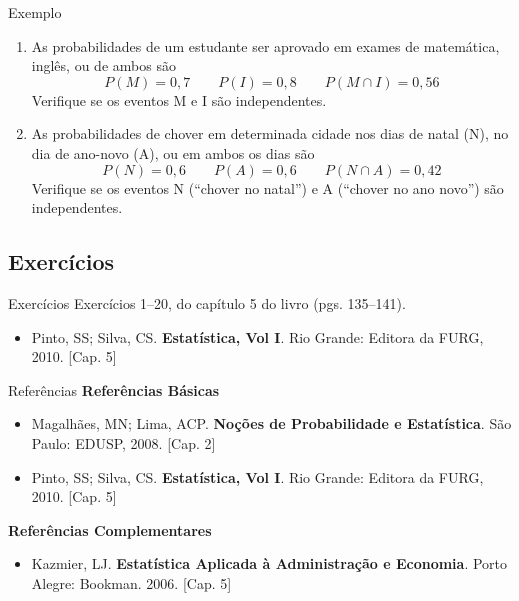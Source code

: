 \documentclass[10pt]{beamer}\usepackage[]{graphicx}\usepackage[]{color}
\theoremstyle{definition}
\begin{document}
\begin{frame}{Exemplo}
  \begin{enumerate}
  \item As probabilidades de um estudante ser aprovado em exames de
    matemática, inglês, ou de ambos são
    \begin{equation*}
      P(M) = 0,7 \qquad P(I) = 0,8 \qquad P(M \cap I) = 0,56
    \end{equation*}
    Verifique se os eventos M e I são independentes.
  \item As probabilidades de chover em determinada cidade nos
    dias de natal (N), no dia de ano-novo (A), ou em ambos os dias são
    \begin{equation*}
      P(N) = 0,6 \qquad P(A) = 0,6 \qquad P(N \cap A) = 0,42
    \end{equation*}
    Verifique se os eventos N (``chover no natal'') e A (``chover no ano
    novo'') são independentes.
  \end{enumerate}
\end{frame}

\subsection{Exercícios}

\begin{frame}[fragile]{Exercícios}
  Exercícios 1--20, do capítulo 5 do livro (pgs. 135--141).
  \vspace{1em}
  \begin{itemize}
  \item[] Pinto, SS; Silva, CS. \textbf{Estatística, Vol I}. Rio Grande:
    Editora da FURG, 2010. [Cap. 5]
  \end{itemize}
\end{frame}

\begin{frame}{Referências}
  \textbf{Referências Básicas}
  \begin{itemize}
  \item Magalhães, MN; Lima, ACP. \textbf{Noções de Probabilidade e
      Estatística}. São Paulo: EDUSP, 2008. [Cap. 2]
  \item Pinto, SS; Silva, CS. \textbf{Estatística, Vol I}. Rio Grande:
    Editora da FURG, 2010. [Cap. 5]
  \end{itemize}
  \textbf{Referências Complementares}
  \begin{itemize}
  \item Kazmier, LJ. \textbf{Estatística Aplicada à Administração e
      Economia}. Porto Alegre: Bookman. 2006. [Cap. 5]
  \end{itemize}
\end{frame}
\end{document}
